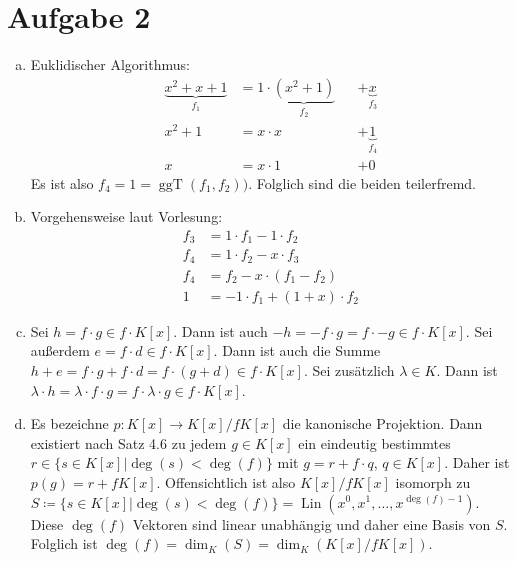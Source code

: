 \documentclass{article}
\begin{document}
\section*{Aufgabe 2}
\begin{enumerate}[(a)]
	\item Euklidischer Algorithmus:
	      \begin{align*}
		      \underbrace{x^2 + x + 1}_{f_1} & = 1 \cdot \underbrace{(x^2 + 1)}_{f_2} &  & + \underbrace{x}_{f_3} \\
		      x^2 + 1                        & = x \cdot x                            &  & + \underbrace{1}_{f_4} \\
		      x                              & = x \cdot 1                            &  & + 0
	      \end{align*}
	      Es ist also $f_4 = 1 = \operatorname{ggT}(f_1, f_2))$. Folglich sind die beiden teilerfremd.
	\item Vorgehensweise laut Vorlesung:
	      \begin{align*}
		      f_3 & = 1 \cdot f_1 - 1 \cdot f_2      \\
		      f_4 & = 1 \cdot f_2 - x \cdot f_3      \\
		      f_4 & = f_2 - x \cdot (f_1 - f_2)      \\
		      1   & = -1 \cdot f_1 + (1+x) \cdot f_2
	      \end{align*}
	\item Sei $h = f\cdot g \in f\cdot K[x]$. Dann ist auch $-h = - f \cdot g = f \cdot -g \in f\cdot K[x]$. Sei außerdem $e = f\cdot d \in f\cdot K[x]$. Dann ist auch die Summe $h + e = f\cdot g + f\cdot d = f \cdot (g + d) \in f\cdot K[x]$.
	      Sei zusätzlich $\lambda \in K$. Dann ist $\lambda \cdot h = \lambda \cdot f\cdot g = f \cdot \lambda \cdot g \in f\cdot K[x]$.
	\item Es bezeichne $p: K[x] \to K[x]/fK[x]$ die kanonische Projektion. Dann existiert nach Satz 4.6 zu jedem $g \in K[x]$ ein eindeutig bestimmtes $r \in \{s\in K[x] | \deg(s) < \deg(f)\}$ mit $g = r + f \cdot q$, $q\in K[x]$. Daher ist $p(g) = r + fK[x]$. Offensichtlich ist also $K[x]/fK[x]$ isomorph zu $S \coloneqq \{s\in K[x] | \deg(s) < \deg(f)\} = \operatorname{Lin}(x^0, x^1, \dots, x^{\deg(f)-1})$. Diese $\deg(f)$ Vektoren sind linear unabhängig und daher eine Basis von $S$. Folglich ist $\deg(f) = \dim_K(S) = \dim_K(K[x]/fK[x])$.
\end{enumerate}
\end{document}
